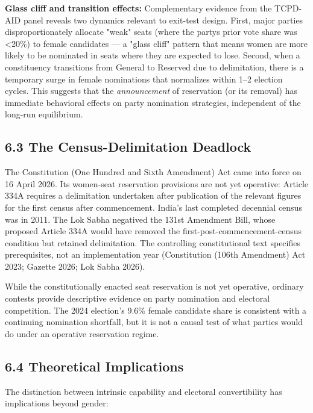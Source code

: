 \documentclass[
]{article}
\begin{document}
\textbf{Glass cliff and transition effects:} Complementary evidence from the TCPD-AID panel reveals two dynamics relevant to exit-test design. First, major parties disproportionately allocate "weak" seats (where the party\textquotesingle s prior vote share was \textless20\%) to female candidates --- a "glass cliff" pattern that means women are more likely to be nominated in seats where they are expected to lose. Second, when a constituency transitions from General to Reserved due to delimitation, there is a temporary surge in female nominations that normalizes within 1--2 election cycles. This suggests that the \emph{announcement} of reservation (or its removal) has immediate behavioral effects on party nomination strategies, independent of the long-run equilibrium.

\subsection{6.3 The Census-Delimitation Deadlock}\label{63-the-census-delimitation-deadlock}

The Constitution (One Hundred and Sixth Amendment) Act came into force on 16 April 2026. Its women-seat reservation provisions are not yet operative: Article 334A requires a delimitation undertaken after publication of the relevant figures for the first census after commencement. India's last completed decennial census was in 2011. The Lok Sabha negatived the 131st Amendment Bill, whose proposed Article 334A would have removed the first-post-commencement-census condition but retained delimitation. The controlling constitutional text specifies prerequisites, not an implementation year (Constitution (106th Amendment) Act 2023; Gazette 2026; Lok Sabha 2026).

While the constitutionally enacted seat reservation is not yet operative, ordinary contests provide descriptive evidence on party nomination and electoral competition. The 2024 election's 9.6\% female candidate share is consistent with a continuing nomination shortfall, but it is not a causal test of what parties would do under an operative reservation regime.

\subsection{6.4 Theoretical Implications}\label{64-theoretical-implications}

The distinction between intrinsic capability and electoral convertibility has implications beyond gender:
\end{document}

